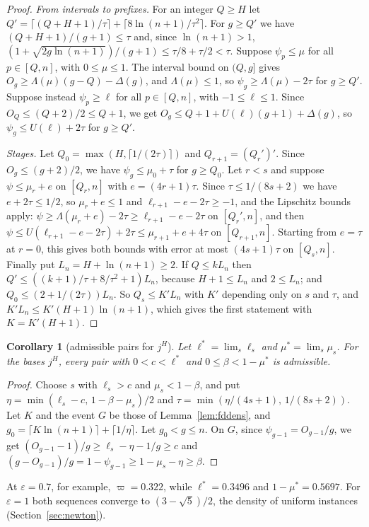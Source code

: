 \documentclass[11pt]{amsart}
\newtheorem{corollary}[theorem]{Corollary}
\theoremstyle{definition}
\theoremstyle{remark}
\newcommand{\eps}{\varepsilon}
\begin{document}
\begin{proof}
\emph{From intervals to prefixes.} For an integer $Q\ge H$ let
$Q'=\lceil(Q+H+1)/\tau\rceil+\lceil8\ln(n+1)/\tau^2\rceil$. For $g\ge Q'$ we have
$(Q+H+1)/(g+1)\le\tau$ and, since $\ln(n+1)>1$,
$(1+\sqrt{2g\ln(n+1)})/(g+1)\le\tau/8+\tau/2<\tau$. Suppose $\psi_p\le\mu$ for all $p\in[Q,n]$,
with $0\le\mu\le1$. The interval bound on $(Q,g]$ gives $O_g\ge\Lambda(\mu)(g-Q)-\Delta(g)$, and
$\Lambda(\mu)\le1$, so $\psi_g\ge\Lambda(\mu)-2\tau$ for $g\ge Q'$. Suppose instead $\psi_p\ge\ell$
for all $p\in[Q,n]$, with $-1\le\ell\le1$. Since $O_Q\le(Q+2)/2\le Q+1$, we get
$O_g\le Q+1+U(\ell)(g+1)+\Delta(g)$, so $\psi_g\le U(\ell)+2\tau$ for $g\ge Q'$.

\emph{Stages.} Let $Q_0=\max(H,\lceil1/(2\tau)\rceil)$ and $Q_{r+1}=(Q_r')'$. Since
$O_g\le(g+2)/2$, we have $\psi_g\le\mu_0+\tau$ for $g\ge Q_0$. Let $r<s$ and suppose
$\psi\le\mu_r+e$ on $[Q_r,n]$ with $e=(4r+1)\tau$. Since $\tau\le1/(8s+2)$ we have
$e+2\tau\le1/2$, so $\mu_r+e\le1$ and $\ell_{r+1}-e-2\tau\ge-1$, and the Lipschitz bounds apply:
$\psi\ge\Lambda(\mu_r+e)-2\tau\ge\ell_{r+1}-e-2\tau$ on $[Q_r',n]$, and then
$\psi\le U(\ell_{r+1}-e-2\tau)+2\tau\le\mu_{r+1}+e+4\tau$ on $[Q_{r+1},n]$. Starting from $e=\tau$
at $r=0$, this gives both bounds with error at most $(4s+1)\tau$ on $[Q_s,n]$. Finally put
$L_n=H+\ln(n+1)\ge2$. If $Q\le kL_n$ then $Q'\le((k+1)/\tau+8/\tau^2+1)L_n$, because
$H+1\le L_n$ and $2\le L_n$; and $Q_0\le(2+1/(2\tau))L_n$. So $Q_s\le K'L_n$ with $K'$ depending
only on $s$ and $\tau$, and $K'L_n\le K'(H+1)\ln(n+1)$, which gives the first statement with
$K=K'(H+1)$.
\end{proof}

\begin{corollary}[admissible pairs for $j^H$]\label{cor:fdadm}
Let $\ell^*=\lim_s\ell_s$ and $\mu^*=\lim_s\mu_s$. For the bases $j^H$, every pair with
$0<c<\ell^*$ and $0\le\beta<1-\mu^*$ is admissible.
\end{corollary}

\begin{proof}
Choose $s$ with $\ell_s>c$ and $\mu_s<1-\beta$, and put $\eta=\min(\ell_s-c,\,1-\beta-\mu_s)/2$
and $\tau=\min(\eta/(4s+1),\,1/(8s+2))$. Let $K$ and the event $G$ be those of
Lemma~\ref{lem:fddens}, and $g_0=\lceil K\ln(n+1)\rceil+\lceil1/\eta\rceil$. Let $g_0<g\le n$.
On $G$, since $\psi_{g-1}=O_{g-1}/g$, we get $(O_{g-1}-1)/g\ge\ell_s-\eta-1/g\ge c$ and
$(g-O_{g-1})/g=1-\psi_{g-1}\ge1-\mu_s-\eta\ge\beta$.
\end{proof}

\noindent At $\eps=0.7$, for example, $\varpi=0.322$, while $\ell^*=0.3496$ and
$1-\mu^*=0.5697$. For $\eps=1$ both sequences converge to $(3-\sqrt5)/2$, the density of uniform
instances (Section~\ref{sec:newton}).
\end{document}
